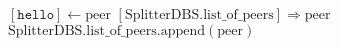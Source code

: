 \documentclass{article}
\begin{document}
\pagestyle{empty}

\newcommand{\send}{\Rightarrow}
\newcommand{\sendto}{\rightarrow}
\newcommand{\recv}{\Leftarrow}
\algrenewcommand\textproc{\textrm}

\begin{algorithmic}

  \algrenewcommand{}
  
  \algrenewcommand{}
  \State $[\mathtt{hello}] \leftarrow \text{peer}$
  \State $[\text{SplitterDBS}.\text{list\_of\_peers}] \send \text{peer}$
  \State $\text{SplitterDBS}.\text{list\_of\_peers}.\text{append}(\text{peer})$
  \EndWhile
  \EndProcedure

  \EndFunction
 
  \EndProcedure
  
\end{algorithmic}
\end{document}

